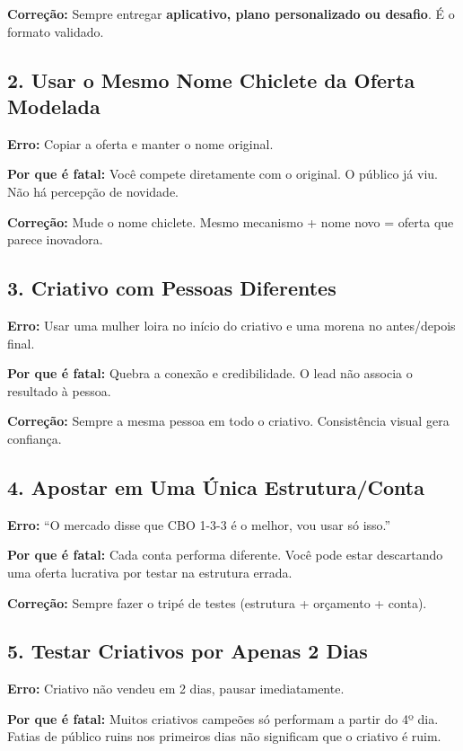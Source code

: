 \documentclass[12pt, a4paper]{article}
\begin{document}
\textbf{Correção:} Sempre entregar \textbf{aplicativo, plano personalizado ou desafio}. É o formato validado.

\subsection{2. Usar o Mesmo Nome Chiclete da Oferta Modelada}

\textbf{Erro:} Copiar a oferta e manter o nome original.

\textbf{Por que é fatal:} Você compete diretamente com o original. O público já viu. Não há percepção de novidade.

\textbf{Correção:} Mude o nome chiclete. Mesmo mecanismo + nome novo = oferta que parece inovadora.

\subsection{3. Criativo com Pessoas Diferentes}

\textbf{Erro:} Usar uma mulher loira no início do criativo e uma morena no antes/depois final.

\textbf{Por que é fatal:} Quebra a conexão e credibilidade. O lead não associa o resultado à pessoa.

\textbf{Correção:} Sempre a mesma pessoa em todo o criativo. Consistência visual gera confiança.

\subsection{4. Apostar em Uma Única Estrutura/Conta}

\textbf{Erro:} ``O mercado disse que CBO 1-3-3 é o melhor, vou usar só isso.''

\textbf{Por que é fatal:} Cada conta performa diferente. Você pode estar descartando uma oferta lucrativa por testar na estrutura errada.

\textbf{Correção:} Sempre fazer o tripé de testes (estrutura + orçamento + conta).

\subsection{5. Testar Criativos por Apenas 2 Dias}

\textbf{Erro:} Criativo não vendeu em 2 dias, pausar imediatamente.

\textbf{Por que é fatal:} Muitos criativos campeões só performam a partir do 4º dia. Fatias de público ruins nos primeiros dias não significam que o criativo é ruim.
\end{document}
